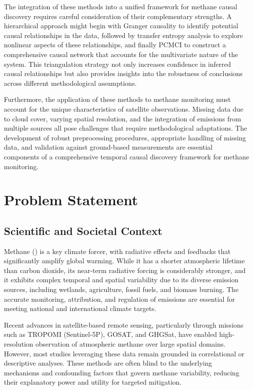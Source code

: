 The integration of these methods into a unified framework for methane causal discovery requires careful consideration of their complementary strengths. A hierarchical approach might begin with Granger causality to identify potential causal relationships in the data, followed by transfer entropy analysis to explore nonlinear aspects of these relationships, and finally PCMCI to construct a comprehensive causal network that accounts for the multivariate nature of the system. This triangulation strategy not only increases confidence in inferred causal relationships but also provides insights into the robustness of conclusions across different methodological assumptions.

Furthermore, the application of these methods to methane monitoring must account for the unique characteristics of satellite observations. Missing data due to cloud cover, varying spatial resolution, and the integration of emissions from multiple sources all pose challenges that require methodological adaptations. The development of robust preprocessing procedures, appropriate handling of missing data, and validation against ground-based measurements are essential components of a comprehensive temporal causal discovery framework for methane monitoring.


\section{Problem Statement}
\label{sec:problem-statement}

\subsection{Scientific and Societal Context}

Methane () is a key climate forcer, with radiative effects and feedbacks that significantly amplify global warming. While it has a shorter atmospheric lifetime than carbon dioxide, its near-term radiative forcing is considerably stronger, and it exhibits complex temporal and spatial variability due to its diverse emission sources, including wetlands, agriculture, fossil fuels, and biomass burning. The accurate monitoring, attribution, and regulation of  emissions are essential for meeting national and international climate targets.

Recent advances in satellite-based remote sensing, particularly through missions such as TROPOMI (Sentinel-5P), GOSAT, and GHGSat, have enabled high-resolution observation of atmospheric methane over large spatial domains. However, most studies leveraging these data remain grounded in correlational or descriptive analyses. These methods are often blind to the underlying mechanisms and confounding factors that govern methane variability, reducing their explanatory power and utility for targeted mitigation.

